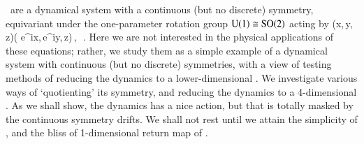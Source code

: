 \CLe\ are a dynamical system with a continuous (but no
discrete) symmetry, equivariant under the one-parameter
rotation group $\textrm{U}(1)\cong\textrm{SO}(2)$ acting by
\beq\label{eq:SO2cle}
	(x,\,y,\,z)\mapsto (
    e^{i\theta}x,\,e^{i\theta}y,\,z)\,,\ \theta\in[0,2\pi]\,.
\eeq
Here we are not interested in the physical
applications of these equations; rather, we study them as a
simple example of a dynamical system with continuous (but no
discrete) symmetries, with a view of testing methods of
reducing the dynamics to a lower-dimensional \reducedsp.
We investigate
various ways of `quotienting' its  symmetry, and
reducing the dynamics to a 4-dim\-ens\-ion\-al \reducedsp. As
we shall show, the dynamics has a nice {\stretchf}
action, but that is totally masked by the continuous symmetry
drifts. We shall not rest until we attain the simplicity of
, and the bliss of 1-dim\-ens\-ion\-al
return map of .

